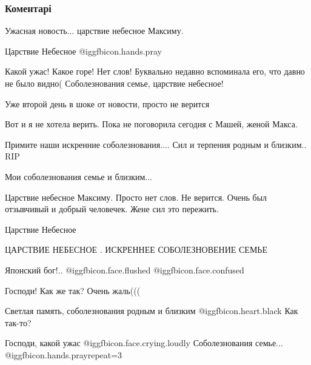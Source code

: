  
 
 
 
 
\subsubsection{Коментарі}

\begin{itemize} %
Ужасная новость... царствие небесное Максиму.

Царствие Небесное  @igg{fbicon.hands.pray} 

Какой ужас! Какое горе! Нет слов!
Буквально недавно вспоминала его, что давно не было видно(
Соболезнования семье, царствие небесное!

Уже второй день в шоке от новости, просто не верится

Вот и я не хотела верить. Пока не поговорила сегодня с Машей, женой Макса.

Примите наши искренние соболезнования....
Сил и терпения родным и близким..
RIP

Мои соболезнования семье и близким...

Царствие небесное Максиму. Просто нет слов. Не верится. Очень был отзывчивый и добрый человечек. Жене сил это пережить.

Царствие Небесное

ЦАРСТВИЕ НЕБЕСНОЕ .
ИСКРЕННЕЕ СОБОЛЕЗНОВЕНИЕ СЕМЬЕ

Японский бог!..  @igg{fbicon.face.flushed}  @igg{fbicon.face.confused} 

Господи! Как же так? Очень жаль(((

Светлая память, соболезнования родным и близким  @igg{fbicon.heart.black} 
Как так-то?


Господи, какой ужас @igg{fbicon.face.crying.loudly}  Соболезнования семье...
@igg{fbicon.hands.pray}{repeat=3} 


\end{itemize}
